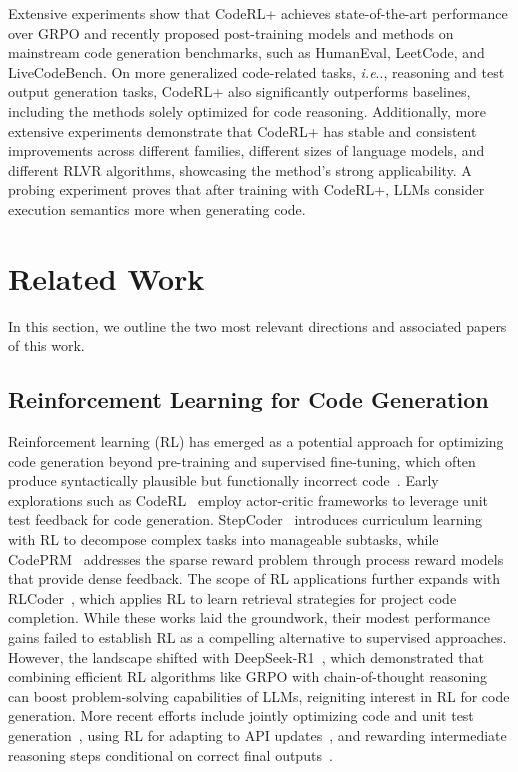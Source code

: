 \documentclass{article}
\makeatletter
\DeclareRobustCommand\onedot{\futurelet\@let@token\@onedot}
\def\@onedot{\ifx\@let@token.\else.\null\fi\xspace}
\def\ie{\emph{i.e}\onedot} \def\Ie{\emph{i.e}\onedot}
\DeclareRobustCommand{\ourapproach}{{\sc CodeRL+}\xspace}
\theoremstyle{definition}
\theoremstyle{remark}
\makeatother
\begin{document}
Extensive experiments show that \ourapproach achieves state-of-the-art performance over GRPO and recently proposed post-training models and methods on mainstream code generation benchmarks, such as HumanEval, LeetCode, and LiveCodeBench. On more generalized code-related tasks, \ie, reasoning and test output generation tasks, \ourapproach also significantly outperforms baselines, including the methods solely optimized for code reasoning. Additionally, more extensive experiments demonstrate that \ourapproach has stable and consistent improvements across different families, different sizes of language models, and different RLVR algorithms, showcasing the method's strong applicability. A probing experiment proves that after training with \ourapproach, LLMs consider execution semantics more when generating code.


\section{Related Work}
In this section, we outline the two most relevant directions and associated papers of this work.

\subsection{Reinforcement Learning for Code Generation}
Reinforcement learning (RL) has emerged as a potential approach for optimizing code generation beyond pre-training and supervised fine-tuning, which often produce syntactically plausible but functionally incorrect code~\citep{codellama,memorize_or_generalize,ROCODE}\nocite{CodeScore,SEED}. 
Early explorations such as CodeRL~\citep{le2022coderl} employ actor-critic frameworks to leverage unit test feedback for code generation. StepCoder~\citep{dou2024stepcoder} introduces curriculum learning with RL to decompose complex tasks into manageable subtasks, while CodePRM~\citep{li2025codeprm} addresses the sparse reward problem through process reward models that provide dense feedback. The scope of RL applications further expands with RLCoder~\citep{wang2024rlcoder}, which applies RL to learn retrieval strategies for project code completion.
While these works laid the groundwork, their modest performance gains failed to establish RL as a compelling alternative to supervised approaches. However, the landscape shifted with DeepSeek-R1~\citep{guo2025deepseek}, which demonstrated that combining efficient RL algorithms like GRPO with chain-of-thought reasoning can boost problem-solving capabilities of LLMs, reigniting interest in RL for code generation. More recent efforts include jointly optimizing code and unit test generation~\citep{tester_coder}, using RL for adapting to API updates~\citep{wu2025recode}, and rewarding intermediate reasoning steps conditional on correct final outputs~\citep{fan2025posterior}. 
\end{document}

